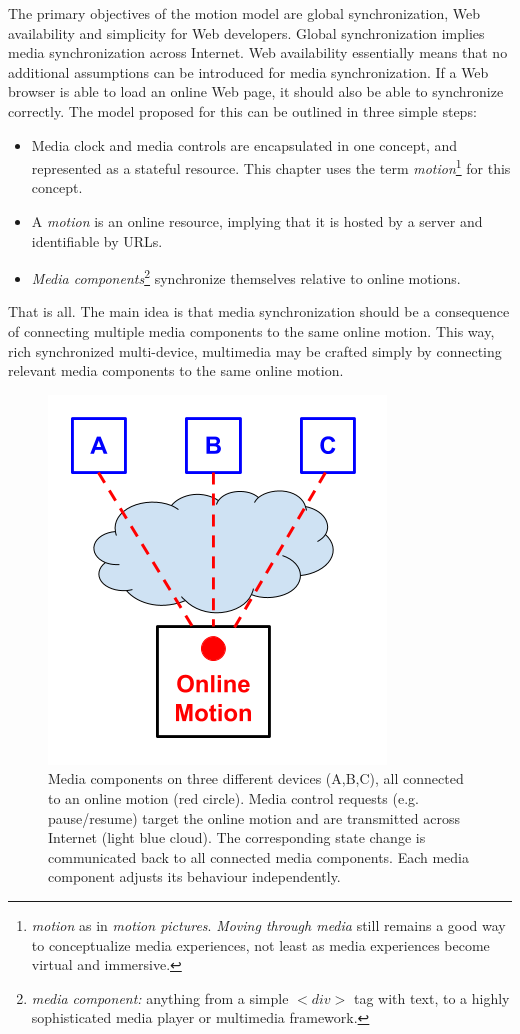 The primary objectives of the motion model are global synchronization, Web
availability and simplicity for Web developers. Global synchronization implies
media synchronization across Internet. Web availability essentially means
that no additional assumptions can be introduced for media synchronization. If a Web browser is able
to load an online Web page, it should also be able to synchronize correctly.
The model proposed for this can be outlined in three simple steps:

\begin{itemize}
\item{Media clock and media controls are encapsulated in one concept, and
represented as a stateful resource. This chapter uses the term \emph{motion}\footnote{\emph{motion} as in \emph{motion pictures}. \emph{Moving through media} still remains a good way to conceptualize media experiences, not least as media experiences become virtual and immersive.
} for this
concept.} 
\item{A \emph{motion} is an online resource, implying that it is hosted by a
server and identifiable by URLs.}
\item{\emph{Media components}\footnote{\emph{media component:} anything from a simple $<div>$ tag with text, to a highly sophisticated media player or multimedia framework.
} synchronize themselves relative to online motions.}
\end{itemize}

That is all. The main idea is that media synchronization should be a
consequence of connecting multiple media components to the same online motion.
This way, rich synchronized multi-device, multimedia may be crafted simply by
connecting relevant media components to the same online motion.

\begin{figure}[h]
\centering
\includegraphics[scale=.4]{fig/motion-model.png}
\caption{Media components on three different devices (A,B,C), all connected to an online motion
(red circle). Media control requests (e.g. pause/resume) target the online motion and are transmitted across Internet (light blue cloud). The corresponding state change is
communicated back to all connected media components. Each media component
adjusts its behaviour independently.}
\label{fig:model}
\end{figure}

